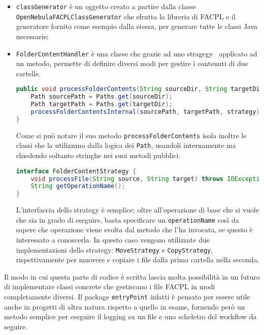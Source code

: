 \begin{itemize}
    \item \texttt{classGenerator} è un oggetto creato a partire dalla classe \texttt{OpenNebulaFACPLClassGenerator} che sfrutta la libreria di FACPL e il generatore fornito come esempio dalla stessa, per generare tutte le classi Java necessarie;
    \item \texttt{FolderContentHandler} è una classe che grazie ad uno stragegy~\cite{GOF} applicato ad un metodo, permette di definire diversi modi per gestire i contenuti di due cartelle.
    \begin{lstlisting}[language=Java, xleftmargin=1em, caption=Metodo processFolderContent, label=code:processFolderContent, basicstyle=\fontsize{9.5}{10}\ttfamily]
public void processFolderContents(String sourceDir, String targetDir, FolderContentStrategy strategy) throws IOException {
    Path sourcePath = Paths.get(sourceDir);
    Path targetPath = Paths.get(targetDir);
    processFolderContentsInternal(sourcePath, targetPath, strategy);
}
            \end{lstlisting}
    Come si può notare il suo metodo \texttt{processFolderContents} isola inoltre le classi che la utilizzano dalla logica dei \texttt{Path}, usandoli internamente ma chiedendo soltanto stringhe nei suoi metodi pubblici.
    \begin{lstlisting}[language=Java, xleftmargin=1em, caption=Interfaccia FolderContentStrategy, label=code:FolderContentStrategy, basicstyle=\fontsize{9.5}{10}\ttfamily]
interface FolderContentStrategy {
    void processFile(String source, String target) throws IOException;
    String getOperationName();
}
    \end{lstlisting}
    L'interfaccia dello strategy è semplice; oltre all'operazione di base che si vuole che sia in grado di eseguire, basta specificare un \texttt{operationName} così da sapere che operazione viene svolta dal metodo che l'ha invocata, se questo è interessato a conoscerla.
    In questo caso vengono utilizzate due implementazioni dello strategy: \texttt{MoveStrategy} e \texttt{CopyStrategy}, rispettivamente per muovere e copiare i file dalla prima cartella nella seconda.
\end{itemize}
Il modo in cui questa parte di codice è scritta lascia molta possibilità in un futuro di implementare classi concrete che gestiscano i file FACPL in modi completamente diversi. Il package \texttt{entryPoint} infatti è pensato per essere utile anche in progetti di altra natura rispetto a quello in esame, fornendo però un metodo semplice per eseguire il logging su un file e uno scheletro del workflow da seguire.

